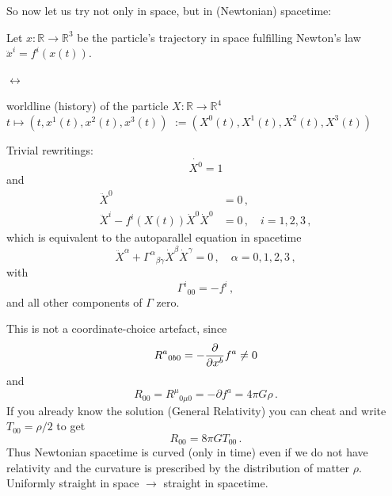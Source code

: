 \documentclass[11pt, a4paper, twocolumn]{article} %
\begin{document}
So now let us try not only in space, but in (Newtonian) spacetime:\\
\bigskip
\begin{minipage}{0.19\textwidth}
Let $x: \mathbb{R} \to \mathbb{R}^3$ be the particle's trajectory
in space fulfilling Newton's law $\ddot{x}^i = f^i(x(t))$.
\end{minipage}
\hfill
$\leftrightarrow$
\hfill
\begin{minipage}{0.25\textwidth}
    worldline (history) of the particle
    $X: \mathbb{R} \to \mathbb{R}^4$\\
    $t\mapsto (t, x^1(t), x^2(t), x^3(t))$
    $:= (X^0(t), X^1(t), X^2(t), X^3(t))$
\end{minipage}
Trivial rewritings:
\begin{equation}
    \dot{X^0} = 1
\end{equation}
and
\begin{align}
    \ddot{X}^0 &= 0\,,\\
    \ddot{X}^i - f^i(X(t))\dot{X}^0\dot{X}^0 &= 0\,,\quad i=1,2,3\,,
\end{align}
which is equivalent to
the autoparallel equation in spacetime
\begin{equation}
    \ddot{X}^\alpha + \Gamma^\alpha{}_{\beta \gamma} \dot{X}^\beta \dot{X}^\gamma = 0\,,\quad \alpha=0,1,2,3\,,
\end{equation}
with
\begin{equation}
    \Gamma^i{}_{00} = -f^i\,,
\end{equation}
and all other components of $\Gamma$ zero.

This is not a coordinate-choice artefact, since
\begin{equation}
    R^{a}{}_{0b0} = -\frac{\partial}{\partial x^b}f^a \neq 0\,\\
\end{equation}
and
\begin{equation}
    R_{00} = R^\mu{}_{0\mu 0} = -\partial f^a = 4\pi G \rho\,.
\end{equation}
If you already know the solution (General Relativity) you can cheat and write
$T_{00} = \rho/2$ to get
\begin{equation}
    R_{00} = 8 \pi G T_{00}\,.
    \label{eq:newtGR}
\end{equation}
Thus Newtonian spacetime is curved (only in time) even if we do not
have relativity and the curvature is prescribed by the distribution of
matter $\rho$.
Uniformly straight in space $\to$ straight in spacetime.
\end{document}
